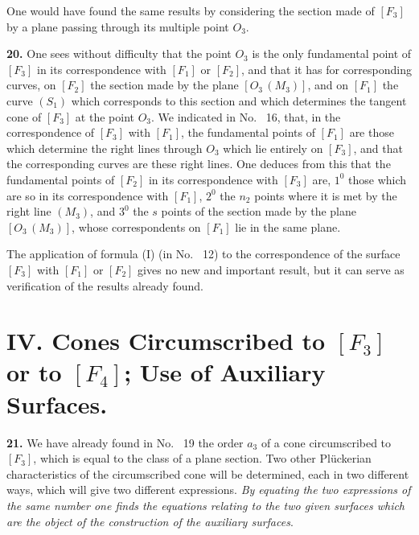 \documentclass{article}
\begin{document}
One would have found the same results by considering the section made of $[F_3]$ by a plane passing through its multiple point $O_3$.

\textbf{20.} One sees without difficulty that the point $O_3$ is the only fundamental point of $[F_3]$ in its correspondence with $[F_1]$ or $[F_2]$, and that it has for corresponding curves, on $[F_2]$ the section made by the plane $[O_3\,(M_3)]$, and on $[F_1]$ the curve $(S_1)$ which corresponds to this section and which determines the tangent cone of $[F_3]$ at the point $O_3$. We indicated in No.~ 16, that, in the correspondence of $[F_3]$ with $[F_1]$, the fundamental points of $[F_1]$ are those which determine the right lines through $O_3$ which lie entirely on $[F_3]$, and that the corresponding curves are these right lines. One deduces from this that the fundamental points of $[F_2]$ in its correspondence with $[F_3]$ are, $1^0$ those which are so in its correspondence with $[F_1]$, $2^0$ the $n_2$ points where it is met by the right line $(M_3)$, and $3^0$ the $s$ points of the section made by the plane $[O_3\,(M_3)]$, whose correspondents on $[F_1]$ lie in the same plane.

The application of formula (I) (in No.~ 12) to the correspondence of the surface $[F_3]$ with $[F_1]$ or $[F_2]$ gives no new and important result, but it can serve as verification of the results already found.

\section*{IV. Cones Circumscribed to $[F_3]$ or to $[F_4]$; Use of Auxiliary Surfaces.}

\textbf{21.} We have already found in No.~ 19 the order $a_3$ of a cone circumscribed to $[F_3]$, which is equal to the class of a plane section. Two other Plückerian characteristics of the circumscribed cone will be determined, each in two different ways, which will give two different expressions. \emph{By equating the two expressions of the same number one finds the equations relating to the two given surfaces which are the object of the construction of the auxiliary surfaces}.
\end{document}
